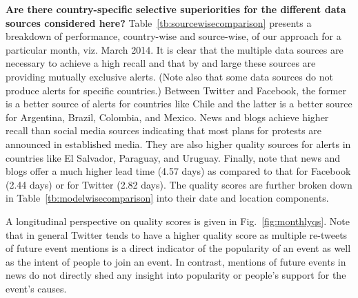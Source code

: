 \documentclass[letterpaper]{article}
\begin{document}
\noindent
{\bf Are there country-specific selective superiorities for the
different data sources considered here?}
Table~\ref{tb:sourcewisecomparison} presents a breakdown of performance,
country-wise and source-wise, of our approach for a particular month,
viz. March 2014.  It is clear that the multiple data sources are
necessary to achieve a high recall and that by and large these sources
are providing mutually exclusive alerts. (Note also that some data
sources do not produce alerts for specific countries.) Between Twitter
and Facebook, the former is a better source of alerts for countries like
Chile and the latter is a better source for Argentina, Brazil, Colombia,
and Mexico.  News and blogs achieve higher recall than social media
sources indicating that most plans for protests are announced in
established media. They are also higher quality sources for alerts in
countries like El Salvador, Paraguay, and Uruguay.  Finally, note that
news and blogs offer a much higher lead time (4.57 days) as compared to
that for Facebook (2.44 days) or for Twitter (2.82 days). The quality
scores are further broken down in Table~\ref{tb:modelwisecomparison}
into their date and location components.

A longitudinal perspective on quality scores is given in
Fig.~\ref{fig:monthlyqs}. Note that in general Twitter tends to have a
higher quality score as multiple re-tweets of future event mentions is a
direct indicator of the popularity of an event as well as the intent of
people to join an event.  In contrast, mentions of future events in news
do not directly shed any insight into popularity or people's support for
the event's causes.\\
\end{document}

